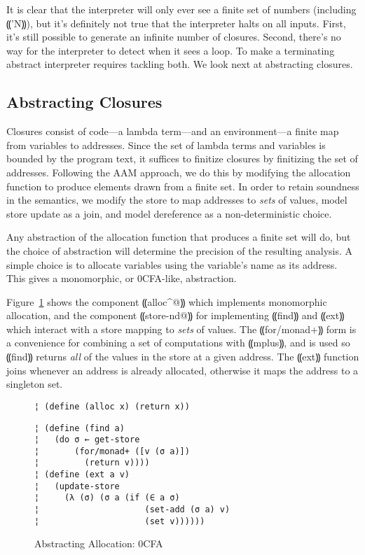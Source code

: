 It is clear that the interpreter will only ever see a finite set of numbers
(including ⸨'N⸩), but it's definitely not true that the interpreter halts on
all inputs.  First, it's still possible to generate an infinite number of
closures.  Second, there's no way for the interpreter to detect when it sees a
loop.  To make a terminating abstract interpreter requires tackling both.  We
look next at abstracting closures.

\subsection{Abstracting Closures}

Closures consist of code---a lambda term---and an environment---a finite map
from variables to addresses.  Since the set of lambda terms and variables is
bounded by the program text, it suffices to finitize closures by finitizing the
set of addresses.  Following the AAM approach, we do this by modifying the
allocation function to produce elements drawn from a finite set.  In order to
retain soundness in the semantics, we modify the store to map addresses to
\emph{sets} of values, model store update as a join, and model dereference as a
non-deterministic choice.

Any abstraction of the allocation function that produces a finite set will do,
but the choice of abstraction will determine the precision of the resulting
analysis.  A simple choice is to allocate variables using the variable's name
as its address.  This gives a monomorphic, or 0CFA-like, abstraction.

Figure~\ref{f:0cfa-abs} shows the component ⸨alloc^@⸩ which implements
monomorphic allocation, and the component ⸨store-nd@⸩ for implementing ⸨find⸩
and ⸨ext⸩ which interact with a store mapping to \emph{sets} of values. The
⸨for/monad+⸩ form is a convenience for combining a set of computations with
⸨mplus⸩, and is used so ⸨find⸩ returns \emph{all} of the values in the store at
a given address.  The ⸨ext⸩ function joins whenever an address is already
allocated, otherwise it maps the address to a singleton set.

\begin{figure} %
\begin{lstlisting}
¦ (define (alloc x) (return x))
\end{lstlisting}
\figskip{}
\begin{lstlisting}
¦ (define (find a)
¦   (do σ ← get-store
¦       (for/monad+ ([v (σ a)])
¦         (return v))))
¦ (define (ext a v)
¦   (update-store
¦     (λ (σ) (σ a (if (∈ a σ) 
¦                     (set-add (σ a) v) 
¦                     (set v))))))
\end{lstlisting}
\caption{Abstracting Allocation: 0CFA}
\label{f:0cfa-abs}
\end{figure} %

